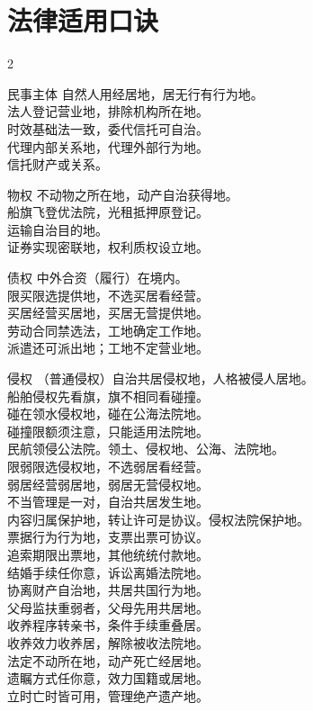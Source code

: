 \clearpage
\section{法律适用口诀}
\begin{paracol}{2}
  \begin{kk}{民事主体}
    自然人用经居地，居无行有行为地。\\
    法人登记营业地，排除机构所在地。\\
    时效基础法一致，委代信托可自治。\\
    代理内部关系地，代理外部行为地。\\
    信托财产或关系。
  \end{kk}

  \begin{kk}{物权}
    不动物之所在地，动产自治获得地。\\
    船旗飞登优法院，光租抵押原登记。\\
    运输自治目的地。\\
    证券实现密联地，权利质权设立地。
  \end{kk}

  \begin{kk}{债权}
    中外合资（履行）在境内。\\
    限买限选提供地，不选买居看经营。\\
    买居经营买居地，买居无营提供地。\\
    劳动合同禁选法，工地确定工作地。\\
    派遣还可派出地；工地不定营业地。
  \end{kk}

  \switchcolumn

  \begin{kk}{侵权}
    （普通侵权）自治共居侵权地，人格被侵人居地。\\
    船舶侵权先看旗，旗不相同看碰撞。\\
    碰在领水侵权地，碰在公海法院地。\\
    碰撞限额须注意，只能适用法院地。\\
    民航领侵公法院。领土、侵权地、公海、法院地。\\
    限弱限选侵权地，不选弱居看经营。\\
    弱居经营弱居地，弱居无营侵权地。\\
    不当管理是一对，自治共居发生地。\\
    内容归属保护地，转让许可是协议。侵权法院保护地。\\
    票据行为行为地，支票出票可协议。\\
    追索期限出票地，其他统统付款地。\\
    结婚手续任你意，诉讼离婚法院地。\\
    协离财产自治地，共居共国行为地。\\
    父母监扶重弱者，父母先用共居地。\\
    收养程序转亲书，条件手续重叠居。\\
    收养效力收养居，解除被收法院地。\\
    法定不动所在地，动产死亡经居地。\\
    遗瞩方式任你意，效力国籍或居地。\\
    立时亡时皆可用，管理绝产遗产地。
  \end{kk}
\end{paracol}
